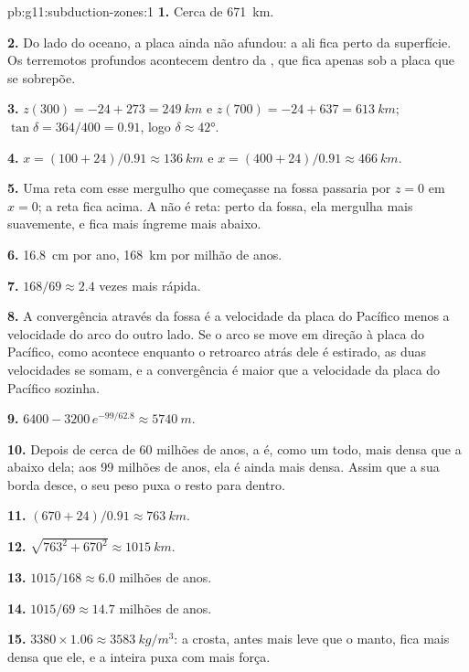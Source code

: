 \begin{solution}{pb:g11:subduction-zones:1}
\textbf{1.} Cerca de \qty{671}{km}.

\textbf{2.} Do lado do oceano, a placa ainda não afundou: a  ali
fica perto da superfície. Os terremotos profundos acontecem dentro da ,
que fica apenas sob a placa que se sobrepõe.

\textbf{3.} $z(300) = -24 + 273 = \qty{249}{km}$ e
$z(700) = -24 + 637 = \qty{613}{km}$; $\tan\delta = 364/400 = 0.91$, logo
$\delta \approx \ang{42}$.

\textbf{4.} $x = (100 + 24)/0.91 \approx \qty{136}{km}$ e
$x = (400 + 24)/0.91 \approx \qty{466}{km}$.

\textbf{5.} Uma reta com esse mergulho que começasse na fossa passaria por
$z = 0$ em $x = 0$; a reta fica acima. A  não é reta: perto da fossa,
ela mergulha mais suavemente, e fica mais íngreme mais abaixo.

\textbf{6.} \qty{16.8}{cm} por ano, \qty{168}{km} por milhão de anos.

\textbf{7.} $168/69 \approx 2.4$ vezes mais rápida.

\textbf{8.} A convergência através da fossa é a velocidade da placa do
Pacífico menos a velocidade do arco do outro lado. Se o arco se move em
direção à placa do Pacífico, como acontece enquanto o retroarco atrás dele é
estirado, as duas velocidades se somam, e a convergência é maior que a
velocidade da placa do Pacífico sozinha.

\textbf{9.} $6400 - 3200\,e^{-99/62.8} \approx \qty{5740}{m}$.

\textbf{10.} Depois de cerca de 60 milhões de anos, a  é,
como um todo, mais densa que a  abaixo dela; aos 99 milhões de
anos, ela é ainda mais densa. Assim que a sua borda desce, o seu peso puxa o
resto para dentro.

\textbf{11.} $(670 + 24)/0.91 \approx \qty{763}{km}$.

\textbf{12.} $\sqrt{763^2 + 670^2} \approx \qty{1015}{km}$.

\textbf{13.} $1015/168 \approx 6.0$ milhões de anos.

\textbf{14.} $1015/69 \approx 14.7$ milhões de anos.

\textbf{15.} $3380 \times 1.06 \approx \qty{3583}{kg/m^3}$: a crosta, antes
mais leve que o manto, fica mais densa que ele, e a  inteira puxa com
mais força.


\end{solution}
